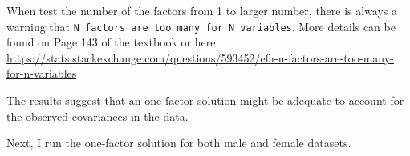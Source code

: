 \documentclass[
]{article}
\newenvironment{Shaded}{\begin{snugshade}}{\end{snugshade}}
\newcommand{\AttributeTok}[1]{\textcolor[rgb]{0.77,0.63,0.00}{#1}}
\newcommand{\ControlFlowTok}[1]{\textcolor[rgb]{0.13,0.29,0.53}{\textbf{#1}}}
\newcommand{\DecValTok}[1]{\textcolor[rgb]{0.00,0.00,0.81}{#1}}
\newcommand{\FloatTok}[1]{\textcolor[rgb]{0.00,0.00,0.81}{#1}}
\newcommand{\FunctionTok}[1]{\textcolor[rgb]{0.00,0.00,0.00}{#1}}
\newcommand{\NormalTok}[1]{#1}
\newcommand{\SpecialCharTok}[1]{\textcolor[rgb]{0.00,0.00,0.00}{#1}}
\newcommand{\StringTok}[1]{\textcolor[rgb]{0.31,0.60,0.02}{#1}}
\begin{document}
\begin{Shaded}
\end{Shaded}

When test the number of the factors from 1 to larger number, there is
always a warning that
\texttt{N\ factors\ are\ too\ many\ for\ N\ variables}. More details can
be found on Page 143 of the textbook or here
\url{https://stats.stackexchange.com/questions/593452/efa-n-factors-are-too-many-for-n-variables}

The results suggest that an one-factor solution might be adequate to
account for the observed covariances in the data.

Next, I run the one-factor solution for both male and female datasets.
\end{document}
